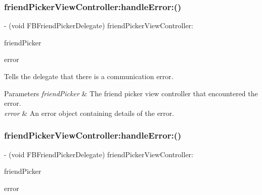 \subsubsection{\texorpdfstring{friend\+Picker\+View\+Controller\+:handle\+Error\+:()}{friendPickerViewController:handleError:()}\hspace{0.1cm}{\footnotesize\ttfamily [4/5]}}
{\footnotesize\ttfamily -\/ (void F\+B\+Friend\+Picker\+Delegate) friend\+Picker\+View\+Controller\+: \begin{DoxyParamCaption}\item[{(\hyperlink{interfaceFBFriendPickerViewController}{F\+B\+Friend\+Picker\+View\+Controller} $\ast$)}]{friend\+Picker }\item[{handleError:(N\+S\+Error $\ast$)}]{error }\end{DoxyParamCaption}\hspace{0.3cm}{\ttfamily [optional]}}

Tells the delegate that there is a communication error.


\begin{DoxyParams}{Parameters}
{\em friend\+Picker} & The friend picker view controller that encountered the error. \\
\hline
{\em error} & An error object containing details of the error. \\
\hline
\end{DoxyParams}
\mbox{\label{protocolFBFriendPickerDelegate_01-p_ac4b023444722c5b44144284f593c8f67}} 
\subsubsection{\texorpdfstring{friend\+Picker\+View\+Controller\+:handle\+Error\+:()}{friendPickerViewController:handleError:()}\hspace{0.1cm}{\footnotesize\ttfamily [5/5]}}
{\footnotesize\ttfamily -\/ (void F\+B\+Friend\+Picker\+Delegate) friend\+Picker\+View\+Controller\+: \begin{DoxyParamCaption}\item[{(\hyperlink{interfaceFBFriendPickerViewController}{F\+B\+Friend\+Picker\+View\+Controller} $\ast$)}]{friend\+Picker }\item[{handleError:(N\+S\+Error $\ast$)}]{error }\end{DoxyParamCaption}\hspace{0.3cm}{\ttfamily [optional]}}

